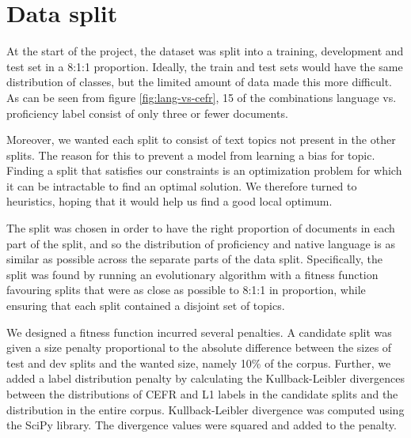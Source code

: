 \section{Data split} \label{sec:datasplit}

At the start of the project, the dataset was split into a training,
development and test set in a 8:1:1 proportion. Ideally, the train and test
sets would have the same distribution of classes, but the limited amount of
data made this more difficult. As can be seen from figure
\ref{fig:lang-vs-cefr}, 15 of the combinations language vs. proficiency label
consist of only three or fewer documents.

Moreover, we wanted each split to consist of text topics not present in the
other splits. The reason for this to prevent a model from learning a bias for
topic. Finding a split that satisfies our constraints is an optimization
problem for which it can be intractable to find an optimal solution. We
therefore turned to heuristics, hoping that it would help us find a good
local optimum.
 
The split was chosen in order to have the right proportion of documents in
each part of the split, and so the distribution of proficiency and native
language is as similar as possible across the separate parts of the data
split. Specifically, the split was found by running an evolutionary algorithm
with a fitness function favouring splits that were as close as possible to
8:1:1 in proportion, while ensuring that each split contained a disjoint set
of topics.

We designed a fitness function incurred several penalties. A candidate split
was given a size penalty proportional to the absolute difference between the
sizes of test and dev splits and the wanted size, namely 10\% of the corpus.
Further, we added a label distribution penalty by calculating the
Kullback-Leibler divergences between the distributions of CEFR and L1 labels
in the candidate splits and the distribution in the entire corpus.
Kullback-Leibler divergence was computed using the SciPy \autocite{scipy}
library. The divergence values were squared and added to the penalty.


